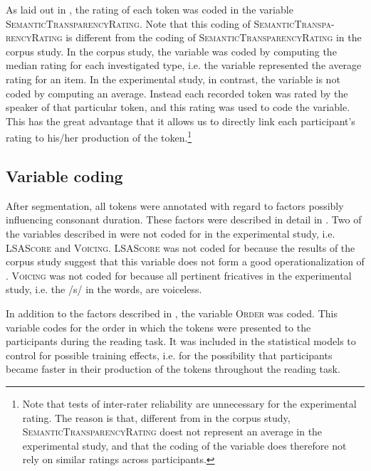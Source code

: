  As laid out in , the rating of each token was coded in the variable  \textsc{SemanticTransparencyRating}. Note that this coding of \textsc{SemanticTranspa-rencyRating} is different from the coding of \textsc{SemanticTransparencyRating} in the corpus study. In the corpus study, the variable was coded by computing the median rating for each investigated type, i.e. the variable represented the average rating for an item. 
 In the experimental study, in contrast, the variable is not coded by computing an average. Instead each recorded token 
 was rated by the speaker of that particular token, and this rating was used to code the variable.
 This has the great advantage that it allows us to directly link each participant's rating to his/her production of the token.\footnote{Note that tests of inter-rater reliability are unnecessary for the experimental rating. The reason is that, different from in the corpus study, \textsc{SemanticTransparencyRating} doest not represent an average in the experimental study, and that the coding of the variable does therefore not rely on similar ratings across participants.} 
 \vspace{-0.3cm}



\subsection{Variable coding} \label{variable coding experiment}
 


After segmentation, all tokens were annotated with regard to factors possibly influencing consonant duration. These factors were described in detail in . 
Two of the variables described in  were not coded for in the experimental study, i.e. \textsc{LSAScore} and \textsc{Voicing}. 
\textsc{LSAScore} was not coded for because the results of the corpus study suggest that this variable does not form a good operationalization of . 
\textsc{Voicing} was not coded for because all pertinent fricatives in the experimental study, i.e. the /s/ in the words, are voiceless.

In addition to the factors described in , the variable \textsc{Order} was coded. This variable codes for the order in which the tokens were presented to the participants during the reading task. It was included in the statistical models to control for possible training effects, i.e. for the possibility that participants became faster in their production of the tokens throughout the reading task.


